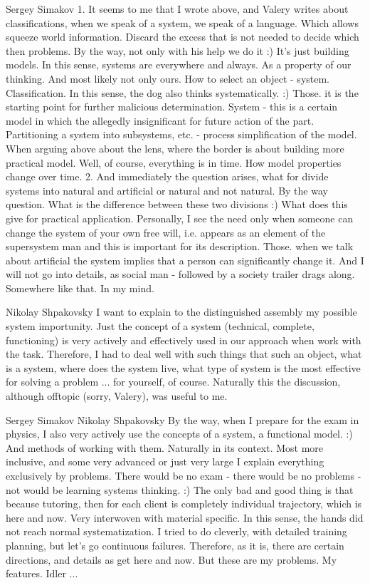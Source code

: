 \documentclass[11pt,a4paper]{article}
\begin{document}
Sergey Simakov 1. It seems to me that I wrote above, and Valery writes about
classifications, when we speak of a system, we speak of a language. Which
allows squeeze world information. Discard the excess that is not needed to
decide which then problems. By the way, not only with his help we do it :)
It's just building models. In this sense, systems are everywhere and
always. As a property of our thinking. And most likely not only ours. How to
select an object - system. Classification. In this sense, the dog also thinks
systematically. :) Those. it is the starting point for further malicious
determination. System - this is a certain model in which the allegedly
insignificant for future action of the part. Partitioning a system into
subsystems, etc. - process simplification of the model. When arguing above
about the lens, where the border is about building more practical model. Well,
of course, everything is in time. How model properties change over
time. 2. And immediately the question arises, what for divide systems into
natural and artificial or natural and not natural. By the way question. What
is the difference between these two divisions :) What does this give for
practical application. Personally, I see the need only when someone can change
the system of your own free will, i.e. appears as an element of the
supersystem man and this is important for its description. Those. when we talk
about artificial the system implies that a person can significantly change
it. And I will not go into details, as social man - followed by a society
trailer drags along. Somewhere like that. In my mind.

Nikolay Shpakovsky I want to explain to the distinguished assembly my possible
system importunity. Just the concept of a system (technical, complete,
functioning) is very actively and effectively used in our approach when work
with the task. Therefore, I had to deal well with such things that such an
object, what is a system, where does the system live, what type of system is
the most effective for solving a problem ... for yourself, of
course. Naturally this the discussion, although offtopic (sorry, Valery), was
useful to me.

Sergey Simakov Nikolay Shpakovsky By the way, when I prepare for the exam in
physics, I also very actively use the concepts of a system, a functional
model. :) And methods of working with them. Naturally in its context. Most
more inclusive, and some very advanced or just very large I explain everything
exclusively by problems. There would be no exam - there would be no problems -
not would be learning systems thinking. :) The only bad and good thing is that
because tutoring, then for each client is completely individual trajectory,
which is here and now. Very interwoven with material specific. In this sense,
the hands did not reach normal systematization. I tried to do cleverly, with
detailed training planning, but let's go continuous failures. Therefore, as it
is, there are certain directions, and details as get here and now. But these
are my problems. My features. Idler ...
\end{document}
